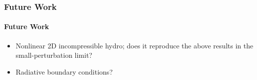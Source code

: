 \documentclass[dvipsnames]{beamer}
\begin{document}
\begin{frame}
    \frametitle{Future Work}
    \framesubtitle{Future Work}

    \begin{itemize}
        \item Nonlinear 2D incompressible hydro; does it reproduce the above
            results in the small-perturbation limit?

        \item Radiative boundary conditions?
    \end{itemize}
\end{frame}
\end{document}
